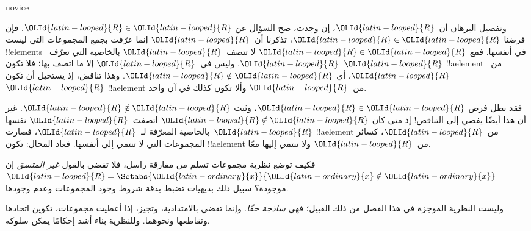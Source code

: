 \documentclass[../../../include/open-logic-section]{subfiles}
\begin{document}
\begin{tagblock}{novice}
\begin{explain}
وتفصيل البرهان أن~$\OLId{latin-looped}{R}$، إن وجدت، صح السؤال عن $\OLId{latin-looped}{R} \in \OLId{latin-looped}{R}$.
فإن فرضنا $\OLId{latin-looped}{R} \in \OLId{latin-looped}{R}$، تذكرنا أن~$\OLId{latin-looped}{R}$ إنما عرّفت بجمع المجموعات التي
ليست !!{element}s في أنفسها. فمع $\OLId{latin-looped}{R} \in \OLId{latin-looped}{R}$ لا تتصف~$\OLId{latin-looped}{R}$ بالخاصية
التي تعرّف~$\OLId{latin-looped}{R}$. وليس في~$\OLId{latin-looped}{R}$ إلا ما اتصف بها؛ فلا تكون~$\OLId{latin-looped}{R}$
!!a{element} من~$\OLId{latin-looped}{R}$، أي $\OLId{latin-looped}{R} \notin \OLId{latin-looped}{R}$. وهذا تناقض، إذ يستحيل
أن تكون~$\OLId{latin-looped}{R}$ !!a{element} من~$\OLId{latin-looped}{R}$ وألا تكون كذلك في آن واحد.

فقد بطل فرض $\OLId{latin-looped}{R} \in \OLId{latin-looped}{R}$، وثبت $\OLId{latin-looped}{R} \notin \OLId{latin-looped}{R}$. غير أن هذا أيضًا
يفضي إلى التناقض!{} إذ متى كان $\OLId{latin-looped}{R} \notin \OLId{latin-looped}{R}$ اتصفت~$\OLId{latin-looped}{R}$ نفسها
بالخاصية المعرّفة لـ~$\OLId{latin-looped}{R}$، فصارت~$\OLId{latin-looped}{R}$ !!a{element} من~$\OLId{latin-looped}{R}$، كسائر
المجموعات التي لا تنتمي إلى أنفسها. فعاد المحال: تكون !!a{element}
من~$\OLId{latin-looped}{R}$ ولا تنتمي إليها معًا.
\end{explain}
\end{tagblock}

\begin{digress}
فكيف توضع نظرية مجموعات تسلم من مفارقة راسل، فلا تقضي بالقول
\emph{غير المتسق} إن $\OLId{latin-looped}{R} = \Setabs{\OLId{latin-ordinary}{x}}{\OLId{latin-ordinary}{x} \notin \OLId{latin-ordinary}{x}}$ موجودة؟
سبيل ذلك بديهيات تضبط بدقة شروط وجود المجموعات وعدم وجودها.

وليست النظرية الموجزة في هذا الفصل من ذلك القبيل؛ فهي
\emph{ساذجة حقًا}. %
وإنما تقضي بالامتدادية، وتجيز، إذا أعطيت مجموعات، تكوين اتحادها
وتقاطعها ونحوهما. وللنظرية بناء أشد إحكامًا يمكن سلوكه.
\end{digress}
\end{document}
